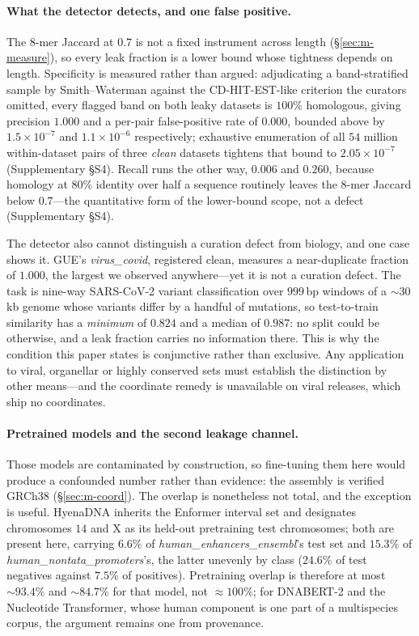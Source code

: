 \documentclass[webpdf,modern,large,namedate]{oup-authoring-template}%
\begin{document}
\paragraph{What the detector detects, and one false positive.}\label{sec:d-detector}
The $8$-mer Jaccard at $0.7$ is not a fixed instrument across length (\S\ref{sec:m-measure}), so every
leak fraction is a lower bound whose tightness depends on length. Specificity is measured rather than
argued: adjudicating a band-stratified sample by Smith--Waterman against the CD-HIT-EST-like criterion
the curators omitted, every flagged band on both leaky datasets is $100\%$ homologous, giving precision
$1.000$ and a per-pair false-positive rate of $0.000$, bounded above by $1.5\times10^{-7}$ and
$1.1\times10^{-6}$ respectively; exhaustive enumeration of all $54$ million within-dataset pairs of
three \emph{clean} datasets tightens that bound to $2.05\times10^{-7}$ (Supplementary \S S4). Recall runs the other way, $0.006$ and $0.260$, because homology at $80\%$
identity over half a sequence routinely leaves the $8$-mer Jaccard below $0.7$---the quantitative form
of the lower-bound scope, not a defect (Supplementary \S S4).

The detector also cannot distinguish a curation defect from biology, and one case shows it. GUE's
\textit{virus\_covid}, registered clean, measures a near-duplicate fraction of $1.000$, the largest we
observed anywhere---yet it is not a curation defect. The task is nine-way SARS-CoV-2 variant
classification over $999$\,bp windows of a ${\sim}30$\,kb genome whose variants differ by a handful of
mutations, so test-to-train similarity has a \emph{minimum} of $0.824$ and a median of $0.987$: no split could be otherwise,
and a leak fraction carries no information there. This is why the condition this paper states is
conjunctive rather than exclusive. Any application to viral, organellar or highly conserved sets must
establish the distinction by other means---and the coordinate remedy is unavailable on viral releases,
which ship no coordinates.

\paragraph{Pretrained models and the second leakage channel.}\label{sec:d-pretrain}
Those models are contaminated by construction, so fine-tuning them here would produce a confounded number rather than evidence: the assembly is verified GRCh38 (\S\ref{sec:m-coord}). The overlap is nonetheless not total, and the exception is useful. HyenaDNA inherits the Enformer interval set \citep{avsec2021enformer} and designates chromosomes $14$ and X as its held-out pretraining test chromosomes; both are present here, carrying $6.6\%$ of \textit{human\_enhancers\_ensembl}'s test set and $15.3\%$ of \textit{human\_nontata\_promoters}'s, the latter unevenly by class ($24.6\%$ of test negatives against $7.5\%$ of positives). Pretraining overlap is therefore at most ${\sim}93.4\%$ and ${\sim}84.7\%$ for that model, not ${\approx}100\%$; for DNABERT-2 and the Nucleotide Transformer, whose human component is one part of a multispecies corpus, the argument remains one from provenance.
\end{document}
